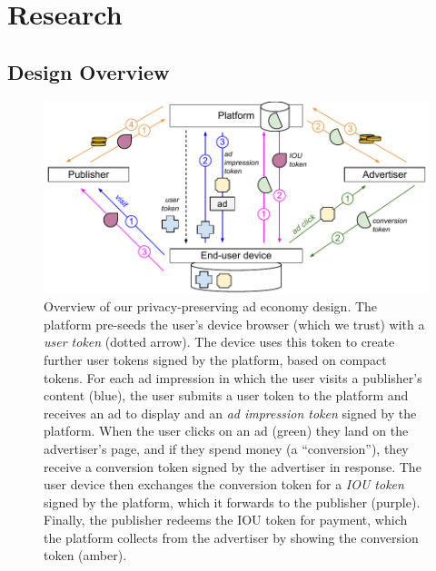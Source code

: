 \section{Research}
\label{r:stuff}

\subsection{Design Overview}
\label{s:design}
%
%
%
%

\begin{figure}
 \centering
 \includegraphics{figures/overview.pdf}
 \caption{Overview of our privacy-preserving ad economy design. The platform pre-seeds the user's device browser (which we trust) with a \emph{user token} (dotted arrow).
	  The device uses this token to create further
	  user tokens signed by the platform, based on compact tokens. For each ad impression in which the user visits a publisher's content ({\color{blue}blue}), the
	  user submits a user token to the platform and receives an ad to display and an \emph{ad impression token} signed by the platform. When the user clicks on an ad
	  ({\color{OliveGreen}green}) they land on the advertiser's page, and if they spend money (a ``conversion''), they receive a conversion token signed by the advertiser in response. The
	  user device then exchanges the conversion token for a \emph{IOU token} signed by the platform, which it forwards to the publisher ({\color{Magenta}purple}). Finally, the publisher
	  redeems the IOU token for payment, which the platform collects from the advertiser by showing the conversion token ({\color{Dandelion}amber}).}
 \label{f:overview}
\end{figure}

